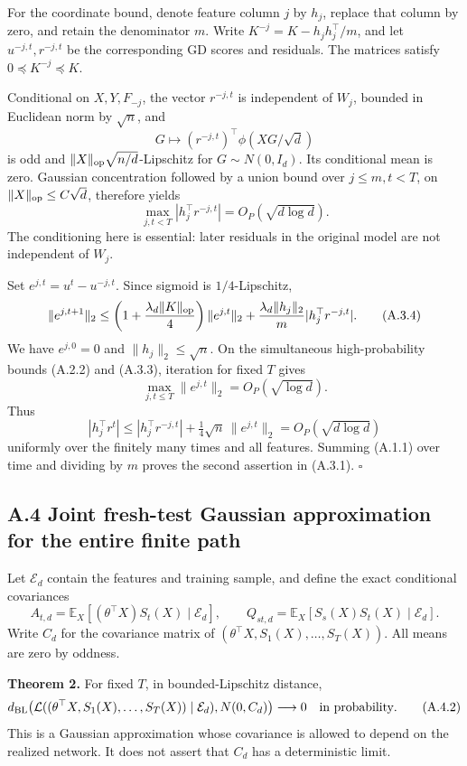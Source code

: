 \documentclass[
  11pt,
  a4paper,
]{article}
\begin{document}
For the coordinate bound, denote feature column \(j\) by \(h_j\),
replace that column by zero, and retain the denominator \(m\). Write
\(K^{-j}=K-h_jh_j^\top/m\), and let \(u^{-j,t},r^{-j,t}\) be the
corresponding GD scores and residuals. The matrices satisfy
\(0\preceq K^{-j}\preceq K\).

Conditional on \(X,Y,F_{-j}\), the vector \(r^{-j,t}\) is independent of
\(W_j\), bounded in Euclidean norm by \(\sqrt n\), and \[
G\mapsto (r^{-j,t})^\top\phi(XG/\sqrt d)
\] is odd and \(\|X\|_{\rm op}\sqrt{n/d}\)-Lipschitz for
\(G\sim N(0,I_d)\). Its conditional mean is zero. Gaussian concentration
followed by a union bound over \(j\le m,t<T\), on
\(\|X\|_{\rm op}\le C\sqrt d\), therefore yields \[
\max_{j,t<T}|h_j^\top r^{-j,t}|=O_P(\sqrt{d\log d}). \tag{A.3.3}
\] The conditioning here is essential: later residuals in the original
model are not independent of \(W_j\).

Set \(e^{j,t}=u^t-u^{-j,t}\). Since sigmoid is \(1/4\)-Lipschitz, \[
\|e^{j,t+1}\|_2
\le\left(1+\frac{\lambda_d\|K\|_{\rm op}}4\right)\|e^{j,t}\|_2
+\frac{\lambda_d\|h_j\|_2}{m}|h_j^\top r^{-j,t}|. \tag{A.3.4}
\] We have \(e^{j,0}=0\) and \(\|h_j\|_2\le\sqrt n\). On the
simultaneous high-probability bounds (A.2.2) and (A.3.3), iteration for
fixed \(T\) gives \[
\max_{j,t\le T}\|e^{j,t}\|_2=O_P(\sqrt{\log d}). \tag{A.3.5}
\] Thus \[
|h_j^\top r^t|
\le|h_j^\top r^{-j,t}|+\tfrac14\sqrt n\,\|e^{j,t}\|_2
=O_P(\sqrt{d\log d})
\] uniformly over the finitely many times and all features. Summing
(A.1.1) over time and dividing by \(m\) proves the second assertion in
(A.3.1). \(\square\)

\hypertarget{a.4-joint-fresh-test-gaussian-approximation-for-the-entire-finite-path}{%
\subsection{A.4 Joint fresh-test Gaussian approximation for the entire
finite
path}\label{a.4-joint-fresh-test-gaussian-approximation-for-the-entire-finite-path}}

Let \(\mathcal E_d\) contain the features and training sample, and
define the exact conditional covariances \[
A_{t,d}=\mathbb E_X[(\theta^\top X)S_t(X)\mid\mathcal E_d],\qquad
Q_{st,d}=\mathbb E_X[S_s(X)S_t(X)\mid\mathcal E_d]. \tag{A.4.1}
\] Write \(C_d\) for the covariance matrix of
\((\theta^\top X,S_1(X),\ldots,S_T(X))\). All means are zero by oddness.

\textbf{Theorem 2.} For fixed \(T\), in bounded-Lipschitz distance, \[
d_{\rm BL}\!\left(
\mathcal L((\theta^\top X,S_1(X),\ldots,S_T(X))\mid\mathcal E_d),
N(0,C_d)\right)\longrightarrow0\quad\text{in probability}. \tag{A.4.2}
\] This is a Gaussian approximation whose covariance is allowed to
depend on the realized network. It does not assert that \(C_d\) has a
deterministic limit.
\end{document}
